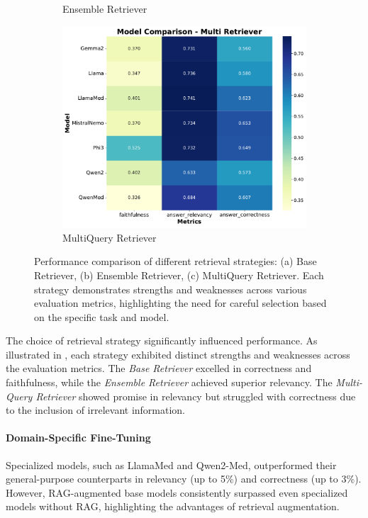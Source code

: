 \begin{figure}[h]
\begin{subfigure}{0.49\textwidth}
    \caption{Ensemble Retriever}
  \end{subfigure}
  \begin{subfigure}{0.49\textwidth}
    \includegraphics[width=\textwidth]{figures/heatmap_Multi}
    \caption{MultiQuery Retriever}
  \end{subfigure}
  \caption{
      Performance comparison of different retrieval strategies: (a) Base Retriever, (b) Ensemble Retriever, (c) MultiQuery Retriever.
      Each strategy demonstrates strengths and weaknesses across various evaluation metrics, highlighting the need for careful selection based on the specific task and model.
  }
  \label{fig:retrievers}
\end{figure}
%
The choice of retrieval strategy significantly influenced performance.
%
As illustrated in , each strategy exhibited distinct strengths and weaknesses across the evaluation metrics.
%
The \textit{Base Retriever} excelled in correctness and faithfulness, while the \textit{Ensemble Retriever} achieved superior relevancy.
%
The \textit{Multi-Query Retriever} showed promise in relevancy but struggled with correctness due to the inclusion of irrelevant information.

\paragraph{Domain-Specific Fine-Tuning}
%
Specialized models, such as LlamaMed and Qwen2-Med, outperformed their general-purpose counterparts in relevancy (up to 5\%) and correctness (up to 3\%).
%
However, \gls{RAG}-augmented base models consistently surpassed even specialized models without \gls{RAG}, highlighting the advantages of retrieval augmentation.

